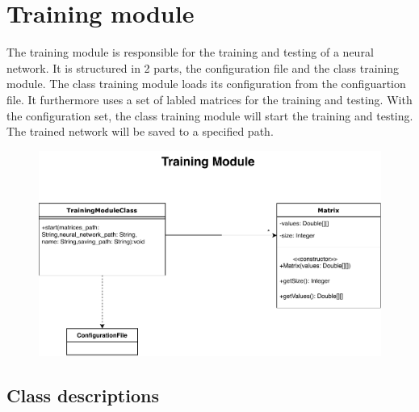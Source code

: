 \documentclass[parskip=full]{scrartcl}
\begin{document}
\section{Training module}
The training module is responsible for the training and testing of a neural network. It is structured in 2 parts, the configuration file and the class training module. The class training module loads its configuration from the configuartion file. It furthermore uses a set of labled matrices for the training and testing. With the configuration set, the class training module will start the training and testing. The trained network will be saved to a specified path.
%
\begin{figure}[h]
\begin{center}
\includegraphics{ClassDiagrams/PDF/TrainingModule_classdiagram.pdf}
\label{Activity Diagrams}
\end{center}
\end{figure}

\subsection{Class descriptions}
\end{document}
